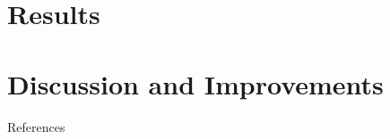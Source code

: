 \documentclass[
    pdf,
    11pt,
    xcolor={svgnames},
  ]{beamer}
\begin{document}
\section{Results}

\section{Discussion and Improvements}

\begin{frame}{References}
\printbibliography
\end{frame}
\end{document}

